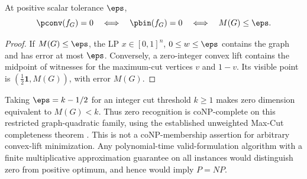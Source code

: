 \begin{lemma}\label{lem:zero-count-maxcut}
At positive scalar tolerance $\eps$,
\[
 \pconv(f_G)=0\quad\Longleftrightarrow\quad\pbin(f_G)=0
               \quad\Longleftrightarrow\quad M(G)\le\eps.
\]
\end{lemma}
\begin{proof}
If $M(G)\le\eps$, the LP $x\in[0,1]^n$, $0\le w\le\eps$ contains
the graph and has error at most $\eps$. Conversely, a zero-integer
convex lift contains the midpoint of witnesses for the maximum-cut
vertices $v$ and $1-v$. Its visible point is
$(\frac12\mathbf1,M(G))$, with error $M(G)$.
\end{proof}

Taking $\eps=k-1/2$ for an integer cut threshold $k\ge1$ makes zero
dimension equivalent to $M(G)<k$. Thus zero recognition is coNP-complete
on this restricted graph-quadratic family, using the established
unweighted Max-Cut completeness theorem \citep{garey1976}. This is not
a coNP-membership assertion for arbitrary convex-lift minimization.
Any polynomial-time valid-formulation algorithm with a finite
multiplicative approximation guarantee on all instances would distinguish
zero from positive optimum, and hence would imply $P=NP$.

